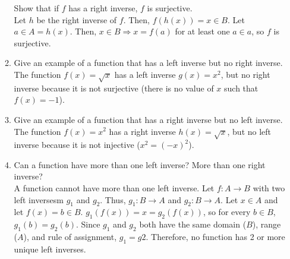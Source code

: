 \documentclass{article}
\begin{document}
\begin{enumerate}
\begin{enumerate}
                        Show that if $f$ has a right inverse, $f$ is surjective.\\
                        Let $h$ be the right inverse of $f$. Then, $f(h(x)) = x \in B$. Let $a \in A  = h(x)$. Then, $x \in B \Rightarrow x = f(a)$ for at least one $a \in a$, so $f$ is surjective.
                  \item Give an example of a function that has a left inverse but no right inverse.\\
                        The function $f(x) = \sqrt{x}$ has a left inverse $g(x) = x^{2}$, but no right inverse because it is not surjective (there is no value of $x$ such that $f(x) = -1$).
                  \item Give an example of a function that has a right inverse but no left inverse.\\
                        The function $f(x) = x^{2}$ has a right inverse $h(x) = \sqrt{x}$, but no left inverse because it is not injective ($x^{2} = (-x)^{2}$).
                  \item Can a function have more than one left inverse? More than one right inverse?\\
                        A function cannot have more than one left inverse. Let $f:A \to B$ with two left inversesm $g_{1}$ and $g_{2}$. Thus, $g_{1}:B \to A$ and $g_{2}: B \to A$. Let $x \in A$ and let $f(x) = b \in B$. $g_{1}(f(x)) = x = g_{2}(f(x))$, so for every $b \in B$, $g_{1}(b) = g_{2}(b)$. Since $g_{1}$ and $g_{2}$ both have the same domain ($B$), range ($A$), and rule of assignment, $g_{1} = g{2}$. Therefore, no function has 2 or more unique left inverses.


\end{enumerate}
\end{enumerate}
\end{document}
